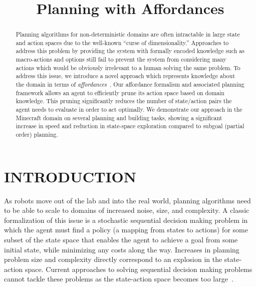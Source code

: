 \documentclass[]{article}
\title{Planning with Affordances}
\newcommand{\stnote}[1]{\textcolor{Blue}{\textbf{ST: #1}}}
\begin{document}
\author{}
\maketitle

\begin{abstract}
Planning algorithms for non-deterministic domains 
are often intractable in large state and action spaces
due to the well-known ``curse of
dimensionality.''  Approaches to address this problem by providing the
system with formally encoded knowledge such as
macro-actions and options still fail to prevent the system from considering many
actions which would be obviously irrelevant to a human solving the
same problem.  To address this issue, we introduce a novel approach
which represents knowledge about the domain in terms of {\em
  affordances}~\citep{gibson77}.  Our affordance formalism and
associated planning framework allows an agent to efficiently prune its
action space based on domain knowledge.  This pruning significantly
reduces the number of state/action pairs the agent needs to evaluate
in order to act optimally.  We demonstrate our approach in the
Minecraft domain on several planning and building tasks, showing a
significant increase in speed and reduction in state-space exploration
compared to subgoal (partial order) planning.
\end{abstract}


\section{INTRODUCTION}

As robots move out of the lab and into the real world, planning
algorithms need to be able to scale to domains of increased noise,
size, and complexity.  A classic formalization of this issue is a
stochastic sequential decision making problem in which
the agent must find a policy (a mapping from states to actions) for 
some subset of the state space that
enables the agent to achieve a goal from some initial state, while minimizing
any costs along the way. 
Increases in planning problem size
and complexity directly correspond to an explosion in the state-action
space. Current approaches to solving sequential decision making
problems cannot tackle these problems as the state-action space
becomes too large~\citep{grounds05}.
\end{document}
